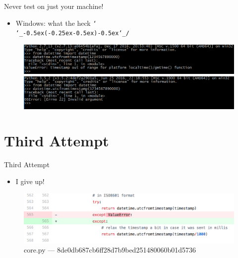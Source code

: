 \documentclass[10pt]{beamer}
\def\shrug{\texttt{\raisebox{0.75em}{\char`\_}\char`\\\char`\_\kern-0.5ex(\kern-0.25ex\raisebox{0.25ex}{\rotatebox{45}{\raisebox{-.75ex}"\kern-1.5ex\rotatebox{-90})}}\kern-0.5ex)\kern-0.5ex\char`\_/\raisebox{0.75em}{\char`\_}}}
\begin{document}
\begin{frame}{Never test on just your machine!}
	\begin{itemize}
		\item Windows: what the heck \shrug
	\end{itemize}
	\begin{figure}
		\includegraphics[width=\textwidth]{images/windows-py27.png}
		\vspace{1cm}
		\includegraphics[width=\textwidth]{images/windows-py35.png}
	\end{figure}
\end{frame}

\section{Third Attempt}
\begin{frame}{Third Attempt}
	\begin{itemize}
		\item I give up!
	\end{itemize}
	\begin{figure}
		\centering
		\includegraphics[width=\textwidth]{images/commit3.png}
		\caption{core.py --- 8de0db687cb6ff28d7b9bed251480060b01d5736}
	\end{figure}
\end{frame}
\end{document}
